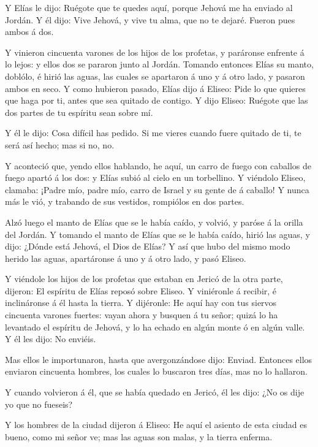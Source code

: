  Y Elías le dijo: Ruégote que te quedes aquí, porque Jehová
me ha enviado al Jordán. Y él dijo: Vive Jehová, y vive tu alma, que no
te dejaré. Fueron pues ambos á dos.

 Y vinieron cincuenta varones de los hijos de los profetas,
y paráronse enfrente á lo lejos: y ellos dos se pararon junto al Jordán.
 Tomando entonces Elías su manto, doblólo, é hirió las
aguas, las cuales se apartaron á uno y á otro lado, y pasaron ambos en
seco.  Y como hubieron pasado, Elías dijo á Eliseo: Pide lo
que quieres que haga por ti, antes que sea quitado de contigo. Y dijo
Eliseo: Ruégote que las dos partes de tu espíritu sean sobre mí.

 Y él le dijo: Cosa difícil has pedido. Si me vieres cuando
fuere quitado de ti, te será así hecho; mas si no, no.

 Y aconteció que, yendo ellos hablando, he aquí, un carro
de fuego con caballos de fuego apartó á los dos: y Elías subió al cielo
en un torbellino.  Y viéndolo Eliseo, clamaba: ¡Padre mío,
padre mío, carro de Israel y su gente de á caballo! Y nunca más le vió,
y trabando de sus vestidos, rompiólos en dos partes.

 Alzó luego el manto de Elías que se le había caído, y
volvió, y paróse á la orilla del Jordán.  Y tomando el
manto de Elías que se le había caído, hirió las aguas, y dijo: ¿Dónde
está Jehová, el Dios de Elías? Y así que hubo del mismo modo herido las
aguas, apartáronse á uno y á otro lado, y pasó Eliseo.

 Y viéndole los hijos de los profetas que estaban en Jericó
de la otra parte, dijeron: El espíritu de Elías reposó sobre Eliseo. Y
viniéronle á recibir, é inclináronse á él hasta la tierra. 
Y dijéronle: He aquí hay con tus siervos cincuenta varones fuertes:
vayan ahora y busquen á tu señor; quizá lo ha levantado el espíritu de
Jehová, y lo ha echado en algún monte ó en algún valle. Y él les dijo:
No enviéis.

 Mas ellos le importunaron, hasta que avergonzándose dijo:
Enviad. Entonces ellos enviaron cincuenta hombres, los cuales lo
buscaron tres días, mas no lo hallaron.

 Y cuando volvieron á él, que se había quedado en Jericó,
él les dijo: ¿No os dije yo que no fueseis?

 Y los hombres de la ciudad dijeron á Eliseo: He aquí el
asiento de esta ciudad es bueno, como mi señor ve; mas las aguas son
malas, y la tierra enferma.

